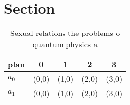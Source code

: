 \documentclass[a4paper]{article}
\begin{document}
\section{Section}

\begin{table}
\begin{adjustbox}{width=0.7\columnwidth}
\begin{tabular}{|l|l|l|l|l|}
\hline
\textbf{plan} & \multicolumn{1}{c|}{\textbf{0}} & \multicolumn{1}{c|}{\textbf{1}} & \multicolumn{1}{c|}{\textbf{2}} & \multicolumn{1}{c|}{\textbf{3}} \\ \hline
\textbf{$a_0$}  & (0,0) & (1,0) & (2,0) & (3,0) \\ \hline
\textbf{$a_1$}  & (0,0) & (1,0) & (2,0) & (3,0) \\ \hline
\end{tabular}
\end{adjustbox}
\caption{Sexual relations the problems o quantum physics a
}
\end{table}
\end{document}

